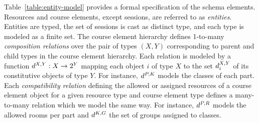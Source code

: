 Table~\ref{table:entity-model} provides a formal specification of the schema elements.
Resources and course elements, except sessions, are referred to as \textit{entities}.
Entities are typed,
the set of sessions is cast as distinct type, 
and each type is modeled as a finite set.
The course element hierarchy
defines 1-to-many \textit{composition relations} over the pair of types
$(X,Y)$ corresponding to parent and child types
in the course element hierarchy. 
Each relation is modeled by a function ${d^{X,Y}}:X\rightarrow2^{Y}$
mapping each object $i$ of type $X$
to the set ${d^{X,Y}_{i}}$ of its constitutive objects of type $Y$.
For instance, 
${d^{P,K}}$ 
models the classes of each part.
Each \textit{compatibility relation}
defining the allowed or assigned resources of a course element object
for a given resource type and course element type
defines a many-to-many relation
which we model the same way.
For instance, 
${d^{P,R}}$
models the allowed rooms per part
and ${d^{K,G}}$
the set of groups assigned to classes.

